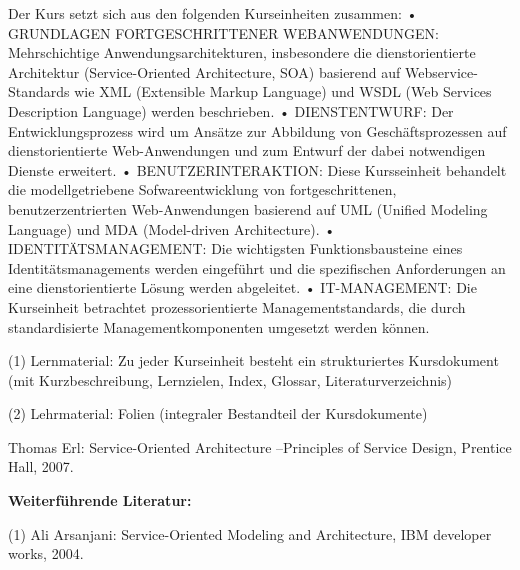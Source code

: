 \begin{course}
\begin{learningoutcomes}
\end{learningoutcomes}

\begin{content}
Der Kurs setzt sich aus den folgenden Kurseinheiten zusammen:\newline
\newline
 • GRUNDLAGEN FORTGESCHRITTENER WEBANWENDUNGEN: Mehrschichtige Anwendungsarchitekturen, insbesondere die dienstorientierte Architektur (Service-Oriented Architecture, SOA) basierend auf Webservice-Standards wie XML (Extensible Markup Language) und WSDL (Web Services Description Language) werden beschrieben. \newline
 • DIENSTENTWURF: Der Entwicklungsprozess wird um Ansätze zur Abbildung von Geschäftsprozessen auf dienstorientierte Web-Anwendungen und zum Entwurf der dabei notwendigen Dienste erweitert. \newline
 • BENUTZERINTERAKTION: Diese Kursseinheit behandelt die modellgetriebene Sofwareentwicklung von fortgeschrittenen, benutzerzentrierten Web-Anwendungen basierend auf UML (Unified Modeling Language) und MDA (Model-driven Architecture).\newline
 • IDENTITÄTSMANAGEMENT: Die wichtigsten Funktionsbausteine eines Identitätsmanagements werden eingeführt und die spezifischen Anforderungen an eine dienstorientierte Lösung werden abgeleitet.\newline
 • IT-MANAGEMENT: Die Kurseinheit betrachtet prozessorientierte Managementstandards, die durch standardisierte Managementkomponenten umgesetzt werden können.


\end{content}

\begin{media}(1) Lernmaterial: Zu jeder Kurseinheit besteht ein strukturiertes Kursdokument (mit Kurzbeschreibung, Lernzielen, Index, Glossar, Literaturverzeichnis)

 

(2) Lehrmaterial: Folien (integraler Bestandteil der Kursdokumente)

\end{media}

\begin{literature}Thomas Erl: Service-Oriented Architecture –Principles of Service Design, Prentice Hall, 2007.

 

\textbf{Weiterführende Literatur:}

 

(1) Ali Arsanjani: Service-Oriented Modeling and Architecture, IBM developer works, 2004.


\end{literature}
\end{course}
